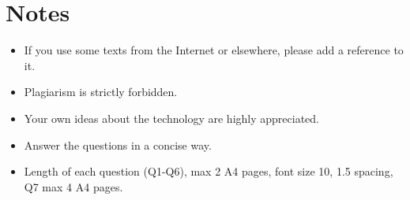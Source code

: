 \documentclass{article}
\begin{document}
\section*{Notes}
\begin{itemize}
\item If you use some texts from the Internet or elsewhere, please add a reference to it.
\item Plagiarism is strictly forbidden.
\item Your own ideas about the technology are highly appreciated.
\item Answer the questions in a concise way.
\item Length of each question (Q1-Q6), max 2 A4 pages, font size 10, 1.5 spacing, Q7 max 4 A4 pages.
\end{itemize}
\end{document}
